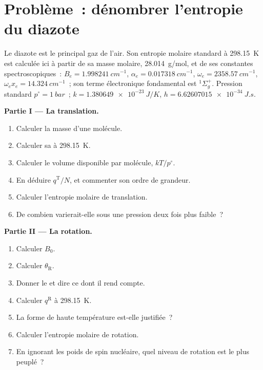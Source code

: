 \section{Problème~: dénombrer l'entropie du diazote}

\begin{problem}
\label{pb:b3:partition-functions:1}
Le diazote est le principal gaz de l'air. Son entropie molaire standard à
\qty{298.15}{K} est calculée ici à partir de sa masse molaire,
\qty{28.014}{g/mol}, et de ses
constantes spectroscopiques~: $B_e = \qty{1.998241}{cm^{-1}}$, $\alpha_e = \qty{0.017318}{cm^{-1}}$, $\omega_e =
\qty{2358.57}{cm^{-1}}$, $\omega_ex_e = \qty{14.324}{cm^{-1}}$~; son terme
électronique fondamental est ${}^1\Sigma_g^+$.
Pression standard $p^\circ = \qty{1}{bar}$~; $k = \qty{1.380649e-23}{J/K}$, $h = \qty{6.62607015e-34}{J.s}$.

\medskip\noindent\textbf{Partie I --- La translation.}
\begin{enumerate}
  \item Calculer la masse d'une molécule.
  \item Calculer sa  à \qty{298.15}{K}.
  \item Calculer le volume disponible par molécule, $kT/p^\circ$.
  \item En déduire $q^{\mathrm T}/N$, et commenter son ordre de grandeur.
  \item Calculer l'entropie molaire de translation.
  \item De combien varierait-elle sous une pression deux fois plus
        faible~?
\end{enumerate}

\medskip\noindent\textbf{Partie II --- La rotation.}
\begin{enumerate}[resume]
  \item Calculer $B_0$.
  \item Calculer $\theta_{\mathrm R}$.
  \item Donner le  et dire ce dont il rend compte.
  \item Calculer $q^{\mathrm R}$ à \qty{298.15}{K}.
  \item La forme de haute température est-elle justifiée~?
  \item Calculer l'entropie molaire de rotation.
  \item En ignorant les poids de spin nucléaire, quel niveau de rotation
        est le plus peuplé~?
\end{enumerate}


\end{problem}
